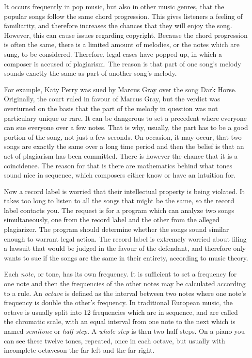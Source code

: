 
It occurs frequently in pop music, but also in other music genres, that the popular songs follow the same chord progression.
This gives listeners a feeling of familiarity, and therefore increases the chances that they will enjoy the song.
However, this can cause issues regarding copyright.
Because the chord progression is often the same, there is a limited amount of melodies, or the notes which are sung, to be considered.
Therefore, legal cases have popped up, in which a composer is accused of plagiarism.
The reason is that part of one song's melody sounds exactly the same as part of another song's melody.

For example, Katy Perry was sued by Marcus Gray over the song Dark Horse.
Originally, the court ruled in favour of Marcus Gray, but the verdict was overturned on the basis that the part of the melody in question was not particulary unique or rare.
It can be dangerous to set a precedent where everyone can sue everyone over a few notes.
That is why, usually, the part has to be a good portion of the song, not just a few seconds.
On occasion, it may occur, that two songs are exactly the same over a long time period and then the belief is that an act of plagiarism has been committed.
There is however the chance that it is a coincidence.
The reason for that is there are mathematics behind what tones sound nice in sequence, which composers either know or have an intuition for.

Now a record label is worried that their intellectual property is being violated.
It takes too long to listen to all the songs that might be the same, so the record label contacts you.
The request is for a program which can analyze two songs simultaneously, one from the record label and the other from the alleged plagiarizer.
The program should determine whether the songs sound similar enough to warrant legal action.
The record label is extremely worried about filing a lawsuit that would be judged in the favour of the defendant, and therefore only wants to sue
if the songs are the same in their entirety, according to music theory.

Each \emph{note}, or tone, has its own frequency. It is sufficient to set a frequency for one note and then the frequencies of the other notes may be calculated according to a rule.
An \emph{octave} is defined as the interval between two notes where one note's frequency is double the other's frequency.
In traditional European music, the octave is usually split into $12$ frequencies which are in sequence, and are called the chromatic scale,
with an equal interval from one note to the next which is named \emph{semitone} or \emph{half step}.
A \emph{whole step} is then two half steps.
On a piano you can see these twelve tones, repeated, once in each octave, but usually with incomplete octaveson the far left and the far right.

